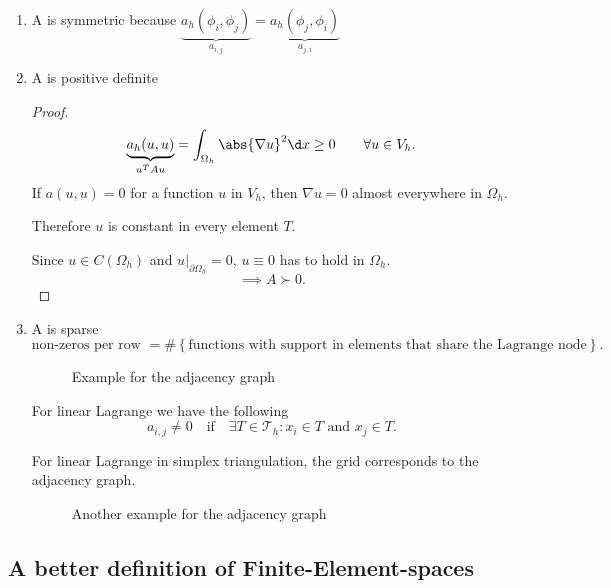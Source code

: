 \begin{enumerate}[label=\alph{enumi})]
	\item A is symmetric because $ \underbrace{a_{h}(\phi
		_{i}, \phi _{j})}_{a_{i,j}} =
		\underbrace{a_{h}(\phi _{j}, \phi _{i})}_{a_{j,i}}
		$
	\item A is positive definite
		\begin{proof}
		\label{thm:Aispositivedefinite}
			\[
					\underbrace{a_{h}(u,u)}_{u^{T}Au} = \int_{\Omega_{h} }\abs{\nabla u} ^2 \d x \geq 0 \qquad \forall u \in V_{h}
			.\] 
			If  $a(u,u)=0$ for a function $u$ in $V_{h}$, then $\nabla u=0$ almost everywhere in $\Omega _{h}$.

			Therefore $u$ is constant in every element $T$.

			Since $u \in C(\Omega _{h})$ and $u|_{\partial \Omega _{h}}=0$, $u \equiv 0$ has to hold in $\Omega _{h}$.
			\[
			\implies A \succ 0
			.\] 
		\end{proof}

	\item A is sparse
		\[
		\text{non-zeros per row } = \#\left\{ \text{functions with support in elements that share the Lagrange node} \right\} 
		.\] 

		\begin{figure}[H]
			\begin{center}
				
			\end{center}
			\caption{Example for the adjacency graph}
			\label{fig:adjacenygraph1}
		\end{figure}
		
		
		For linear Lagrange we have the following
		\[
		a_{i,j}\neq 0 \quad \text{if} \quad \exists T \in \mathcal{T}_{h}\colon x_{i}\in T \text{ and } x_{j} \in T
		.\] 

		For linear Lagrange in simplex triangulation, the grid corresponds to the adjacency graph.
		\begin{figure}[H]
			\begin{center}
				
			\end{center}
			\caption{Another example for the adjacency graph}
			\label{fig:adjacenygraph2}
		\end{figure}
		
\end{enumerate}

\subsection{A better definition of Finite-Element-spaces}
\label{sec:A better definition of Finite-Element-spaces}

